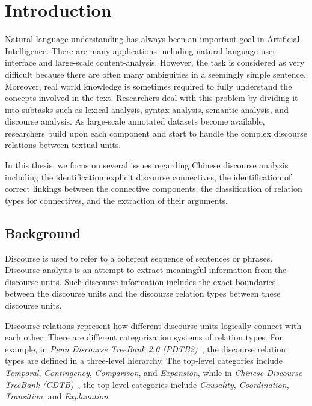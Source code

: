 %
%
%
\chapter{Introduction}
\label{c:intro}

Natural language understanding has always been an important goal in Artificial
Intelligence. There are many applications including natural language user
interface and large-scale content-analysis. However, the task is considered
as very difficult because there are often many ambiguities in a seemingly
simple sentence. Moreover, real world knowledge is sometimes required to fully
understand the concepts involved in the text. Researchers deal with this problem
by dividing it into subtasks such as lexical analysis, syntax analysis, semantic
analysis, and discourse analysis. As large-scale annotated datasets become
available, researchers build upon each component and start to handle the
complex discourse relations between textual units.

In this thesis, we focus on several issues regarding Chinese discourse analysis
including the identification explicit discourse connectives,
the identification of correct linkings between the connective components,
the classification of relation types for connectives,
and the extraction of their arguments. 

%
%
\section{Background}

Discourse is used to refer to a coherent sequence of sentences or phrases.
Discourse analysis is an attempt to extract meaningful information from
the discourse units. Such discourse information includes the exact boundaries
between the discourse units and the discourse relation types between
these discourse units.

Discourse relations represent how different discourse units logically connect
with each other. There are different categorization systems of relation types.
For example, in
\textit{Penn Discourse TreeBank 2.0 (PDTB2)}~\citep{Prasad08thepenn}, the discourse
relation types are defined in a three-level hierarchy. The top-level categories
include \textit{Temporal}, \textit{Contingency}, \textit{Comparison},
and \textit{Expansion}, while in
\textit{Chinese Discourse TreeBank (CDTB)}~\citep{li2014building}, 
the top-level categories include \textit{Causality}, \textit{Coordination},
\textit{Transition}, and \textit{Explanation}.

